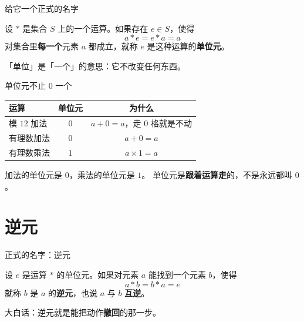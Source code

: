 \documentclass[10pt]{beamer}
\begin{document}
\begin{frame}{给它一个正式的名字}
  \begin{definition}[单位元]
    设 \(*\) 是集合 \(S\) 上的一个运算。如果存在 \(e \in S\)，使得
    \[
      a * e = e * a = a
    \]
    对集合里\textbf{每一个}元素 \(a\) 都成立，就称 \(e\) 是这种运算的\textbf{单位元}。
  \end{definition}
  \pause
  \begin{att}
    「单位」是「一个」的意思：它不改变任何东西。
  \end{att}
\end{frame}

\begin{frame}{单位元不止 \(0\) 一个}
  \begin{center}
  \begin{tabular}{@{}lcc@{}}
    \toprule
    运算 & 单位元 & 为什么 \\
    \midrule
    模 \(12\) 加法 & \(0\) & \(a+0=a\)，走 \(0\) 格就是不动 \\
    有理数加法 & \(0\) & \(a+0=a\) \\
    有理数乘法 & \(1\) & \(a\times1=a\) \\
    \bottomrule
  \end{tabular}
  \end{center}
  \pause
  \begin{att}
    加法的单位元是 \(0\)，乘法的单位元是 \(1\)。
    单位元是\textbf{跟着运算走}的，不是永远都叫 \(0\)。
  \end{att}
\end{frame}

\section{逆元}

\begin{frame}{正式的名字：逆元}
  \begin{definition}[逆元]
    设 \(e\) 是运算 \(*\) 的单位元。如果对元素 \(a\) 能找到一个元素 \(b\)，使得
    \[
      a * b = b * a = e
    \]
    就称 \(b\) 是 \(a\) 的\textbf{逆元}，也说 \(a\) 与 \(b\) \textbf{互逆}。
  \end{definition}
  \pause
  \begin{att}
    大白话：逆元就是能把动作\textbf{撤回}的那一步。
  \end{att}
\end{frame}
\end{document}
